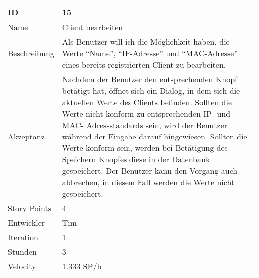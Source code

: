 \begin{table}[htbp]
    \begin{minipage}{\linewidth}
        \setlength{\tymax}{0.5\linewidth}
        \centering
        \small
        \begin{tabulary}{\textwidth}{|l|p{10cm}|} \hline
            ID   &15\\\hline
            Name  &Client bearbeiten\\\hline
	    Beschreibung&Als Benutzer will ich die Möglichkeit haben, die Werte "`Name"', "`IP-Adresse"' und "`MAC-Adresse"' eines bereits registrierten Client zu bearbeiten.\\\hline
	    Akzeptanz &Nachdem der Benutzer den entsprechenden Knopf betätigt hat, öffnet sich ein Dialog, in dem sich die aktuellen Werte des Clients befinden. Sollten die Werte nicht konform zu entsprechenden IP- und MAC- Adressstandards sein, wird der Benutzer während der Eingabe darauf hingewiesen. Sollten die Werte konform sein, werden bei Betätigung des Speichern Knopfes diese in der Datenbank gespeichert. Der Benutzer kann den Vorgang auch abbrechen, in diesem Fall werden die Werte nicht gespeichert. \\\hline
            Story Points&4\\\hline
            Entwickler &Tim\\\hline
            Iteration &1\\\hline
            Stunden  &3\\\hline
            Velocity &1.333 SP\slash h\\\hline
        \end{tabulary}
    \end{minipage}
\end{table}



